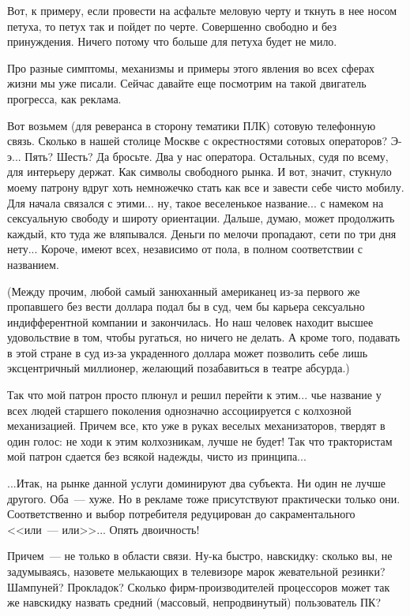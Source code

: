 \documentclass{scrbook}
\newcommand{\flqq}{<<}
\newcommand{\frqq}{>>}
\newcommand{\mdash}{~--- }
\begin{document}
Вот, к примеру, если провести на асфальте меловую черту и ткнуть в нее носом петуха, то петух так и пойдет по черте. Совершенно свободно и без принуждения. Ничего потому что больше для петуха будет не мило.

Про разные симптомы, механизмы и примеры этого явления во всех сферах жизни мы уже писали. Сейчас давайте еще посмотрим на такой двигатель прогресса, как реклама.

Вот возьмем (для реверанса в сторону тематики ПЛК) сотовую телефонную связь. Сколько в нашей столице Москве с окрестностями сотовых операторов? Э-э... Пять? Шесть? Да бросьте. Два у нас оператора. Остальных, судя по всему, для интерьеру держат. Как символы свободного рынка. И вот, значит, стукнуло моему патрону вдруг хоть немножечко стать как все и завести себе чисто мобилу. Для начала связался с этими... ну, такое веселенькое название... с намеком на сексуальную свободу и широту ориентации. Дальше, думаю, может продолжить каждый, кто туда же вляпывался. Деньги по мелочи пропадают, сети по три дня нету... Короче, имеют всех, независимо от пола, в полном соответствии с названием.

(Между прочим, любой самый занюханный американец из-за первого же пропавшего без вести доллара подал бы в суд, чем бы карьера сексуально индифферентной компании и закончилась. Но наш человек находит высшее удовольствие в том, чтобы ругаться, но ничего не делать. А кроме того, подавать в этой стране в суд из-за украденного доллара может позволить себе лишь эксцентричный миллионер, желающий позабавиться в театре абсурда.)

Так что мой патрон просто плюнул и решил перейти к этим... чье название у всех людей старшего поколения однозначно ассоциируется с колхозной механизацией. Причем все, кто уже в руках веселых механизаторов, твердят в один голос: не ходи к этим колхозникам, лучше не будет! Так что трактористам мой патрон сдается без всякой надежды, чисто из принципа...

...Итак, на рынке данной услуги доминируют два субъекта. Ни один не лучше другого. Оба{\mdash}хуже. Но в рекламе тоже присутствуют практически только они. Соответственно и выбор потребителя редуцирован до сакраментального {\flqq}или{\mdash}или{\frqq}... Опять двоичность!

Причем{\mdash}не только в области связи. Ну-ка быстро, навскидку: сколько вы, не задумываясь, назовете мелькающих в телевизоре марок жевательной резинки? Шампуней? Прокладок? Сколько фирм-производителей процессоров может так же навскидку назвать средний (массовый, непродвинутый) пользователь ПК?
\end{document}
